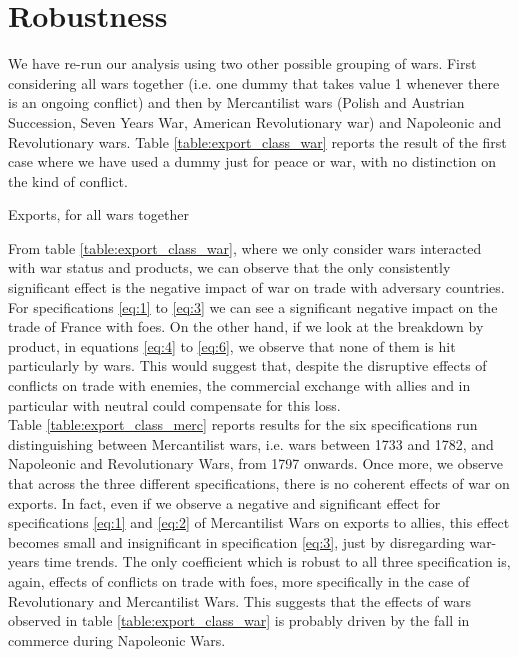 \documentclass[12pt,a4paper,notitlepage,english]{article}
\begin{document}
\section{Robustness}
We have re-run our analysis using two other possible grouping of wars.
First considering all wars together (i.e. one dummy that takes value 1 whenever there is an ongoing conflict) and then by  Mercantilist wars (Polish and Austrian Succession, Seven Years War, American Revolutionary war) and Napoleonic and Revolutionary wars.
Table \ref{table:export_class_war} reports the result of the first case where we have used a dummy just for peace or war, with no distinction on the kind of conflict.
\begin{table}
\begin{center}
\caption {Exports, for all wars together} 
\label{table:export_class_war}
\renewcommand{\arraystretch}{0.6}

\end{center}
\end{table}
From table \ref{table:export_class_war}, where we only consider wars interacted with war status and products, we can observe that the only consistently significant effect is the negative impact of war on trade with adversary countries.
For specifications \ref{eq:1} to \ref{eq:3} we can see a significant negative impact on the trade of France with foes.
On the other hand, if we look at the breakdown by product, in equations \ref{eq:4} to \ref{eq:6}, we observe that none of them is hit particularly by wars.
This would suggest that, despite the disruptive effects of conflicts on trade with enemies, the commercial exchange with allies and in particular with neutral could compensate for this loss.\\
Table \ref{table:export_class_merc} reports results for the six specifications run distinguishing between Mercantilist wars, i.e. wars between 1733 and 1782, and Napoleonic and Revolutionary Wars, from 1797 onwards.
Once more, we observe that across the three different specifications, there is no coherent effects of war on exports.
In fact, even if we observe a negative and significant effect for specifications \ref{eq:1} and \ref{eq:2} of Mercantilist Wars on exports to allies, this effect becomes small and insignificant in specification \ref{eq:3}, just by disregarding war-years time trends.
The only coefficient which is robust to all three specification is, again, effects of conflicts on trade with foes, more specifically in the case of Revolutionary and Mercantilist Wars.
This suggests that the effects of wars observed in table \ref{table:export_class_war} is probably driven by the fall in commerce during Napoleonic Wars.
\end{document}
